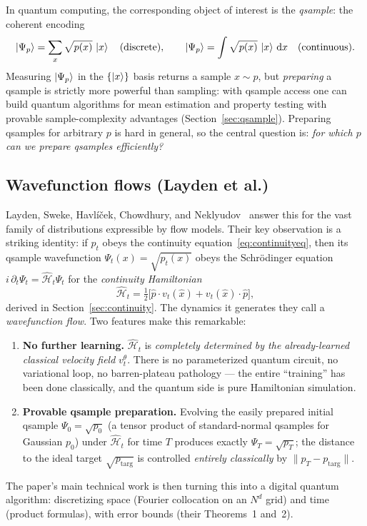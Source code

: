 \documentclass[11pt, a4paper]{article}
\newcommand{\Hgen}{\hat{\mathcal{H}}}
\begin{document}
In quantum computing, the corresponding object of interest is the
\emph{qsample}: the coherent encoding
\begin{equation}
  \ket{\Psi_p}=\sum_x\sqrt{p(x)}\,\ket{x}
  \quad\text{(discrete)},\qquad
  \ket{\Psi_p}=\int\sqrt{p(x)}\,\ket{x}\,\mathrm{d}x
  \quad\text{(continuous)}.
\end{equation}
Measuring $\ket{\Psi_p}$ in the $\{\ket{x}\}$ basis returns a sample
$x\sim p$, but \emph{preparing} a qsample is strictly more powerful than
sampling: with qsample access one can build quantum algorithms for mean
estimation and property testing with provable sample-complexity advantages
(Section~\ref{sec:qsample}). Preparing qsamples for arbitrary $p$ is hard in
general, so the central question is: \emph{for which $p$ can we prepare
qsamples efficiently?}

\subsection{Wavefunction flows (Layden et al.)}

Layden, Sweke, Havl\'i\v{c}ek, Chowdhury, and Neklyudov~\cite{Layden2025}
answer this for the vast family of distributions expressible by flow models.
Their key observation is a striking identity: if $p_t$ obeys the continuity
equation~\eqref{eq:continuityeq}, then its qsample wavefunction
$\Psi_t(x)=\sqrt{p_t(x)}$ obeys the Schr\"odinger equation
$i\,\partial_t\Psi_t=\Hgen_t\Psi_t$ for the \emph{continuity Hamiltonian}
\begin{equation}
  \Hgen_t=\tfrac12\bigl[\hat p\cdot v_t(\hat x)+v_t(\hat x)\cdot\hat p\bigr],
  \label{eq:continuityH}
\end{equation}
derived in Section~\ref{sec:continuity}. The dynamics it generates they call a
\emph{wavefunction flow}. Two features make this remarkable:
\begin{enumerate}
\item \textbf{No further learning.} $\Hgen_t$ is \emph{completely determined by
the already-learned classical velocity field} $v_t^\theta$. There is no
parameterized quantum circuit, no variational loop, no barren-plateau
pathology --- the entire ``training'' has been done classically, and the
quantum side is pure Hamiltonian simulation.
\item \textbf{Provable qsample preparation.} Evolving the easily prepared
initial qsample $\Psi_0=\sqrt{p_0}$ (a tensor product of standard-normal
qsamples for Gaussian $p_0$) under $\Hgen_t$ for time $T$ produces exactly
$\Psi_T=\sqrt{p_T}$; the distance to the ideal target $\sqrt{p_{\mathrm{targ}}}$
is controlled \emph{entirely classically} by $\|p_T-p_{\mathrm{targ}}\|$.
\end{enumerate}
The paper's main technical work is then turning this into a digital quantum
algorithm: discretizing space (Fourier collocation on an $N^d$ grid) and time
(product formulas), with error bounds (their Theorems~1 and~2).
\end{document}
